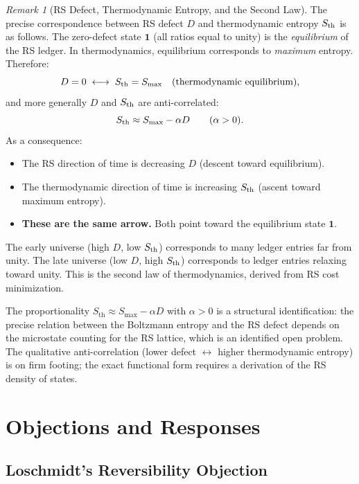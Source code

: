 \documentclass[12pt,a4paper]{article}
\theoremstyle{definition}
\theoremstyle{remark}
\newtheorem{remark}[theorem]{Remark}
\begin{document}
\begin{remark}[RS Defect, Thermodynamic Entropy, and the Second Law]
\label{rem:secondlaw}
The precise correspondence between RS defect $D$ and thermodynamic
entropy $S_{\rm th}$ is as follows.  The zero-defect state $\mathbf{1}$
(all ratios equal to unity) is the \emph{equilibrium} of the RS ledger.
In thermodynamics, equilibrium corresponds to \emph{maximum} entropy.
Therefore:
\[
  D = 0 \;\longleftrightarrow\; S_{\rm th} = S_{\rm max}
  \quad\text{(thermodynamic equilibrium)},
\]
and more generally $D$ and $S_{\rm th}$ are anti-correlated:
\[
  S_{\rm th} \approx S_{\rm max} - \alpha D
  \qquad (\alpha > 0).
\]
As a consequence:
\begin{itemize}[nosep]
  \item The RS direction of time is decreasing $D$ (descent toward
  equilibrium).
  \item The thermodynamic direction of time is increasing $S_{\rm th}$
  (ascent toward maximum entropy).
  \item \textbf{These are the same arrow.}  Both point toward the
  equilibrium state $\mathbf{1}$.
\end{itemize}
The early universe (high $D$, low $S_{\rm th}$) corresponds to many
ledger entries far from unity.  The late universe (low $D$, high
$S_{\rm th}$) corresponds to ledger entries relaxing toward unity.  This
is the second law of thermodynamics, derived from RS cost minimization.

The proportionality $S_\mathrm{th} \approx S_\mathrm{max} - \alpha D$
with $\alpha > 0$ is a structural identification: the precise relation
between the Boltzmann entropy and the RS defect depends on the
microstate counting for the RS lattice, which is an identified open
problem.  The qualitative anti-correlation (lower defect $\leftrightarrow$
higher thermodynamic entropy) is on firm footing; the exact functional
form requires a derivation of the RS density of states.
\end{remark}

\section{Objections and Responses}
\label{sec:objections}

\subsection{Loschmidt's Reversibility Objection}
\end{document}
